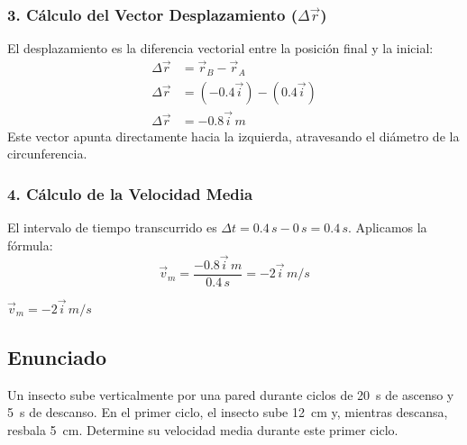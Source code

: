 \documentclass[12pt, a4paper]{article}
\begin{document}
\subsubsection*{3. Cálculo del Vector Desplazamiento ($\Delta \vec{r}$)}

El desplazamiento es la diferencia vectorial entre la posición final y la inicial:
\begin{align*}
    \Delta \vec{r} &= \vec{r}_B - \vec{r}_A \\
    \Delta \vec{r} &= (-0.4\vec{i}) - (0.4\vec{i}) \\
    \Delta \vec{r} &= -0.8\vec{i} \, \si{m}
\end{align*}
Este vector apunta directamente hacia la izquierda, atravesando el diámetro de la circunferencia.

\subsubsection*{4. Cálculo de la Velocidad Media}

El intervalo de tiempo transcurrido es $\Delta t = 0.4 \, \si{s} - 0 \, \si{s} = 0.4 \, \si{s}$. Aplicamos la fórmula:
\begin{equation}
    \vec{v}_m = \frac{-0.8\vec{i} \, \si{m}}{0.4 \, \si{s}} = -2\vec{i} \, \si{m/s}
\end{equation}

\begin{tcolorbox}[colback=green!5!white, colframe=green!50!black, title=Respuesta Final]
\centering \Large $\vec{v}_m = -2\vec{i} \, \si{m/s}$
\end{tcolorbox}

\newpage

\subsection*{Enunciado}
Un insecto sube verticalmente por una pared durante ciclos de \SI{20}{\second} de ascenso y \SI{5}{\second} de descanso. En el primer ciclo, el insecto sube \SI{12}{\centi\metre} y, mientras descansa, resbala \SI{5}{\centi\metre}. Determine su velocidad media durante este primer ciclo.

\begin{center}
\end{center}
\end{document}
